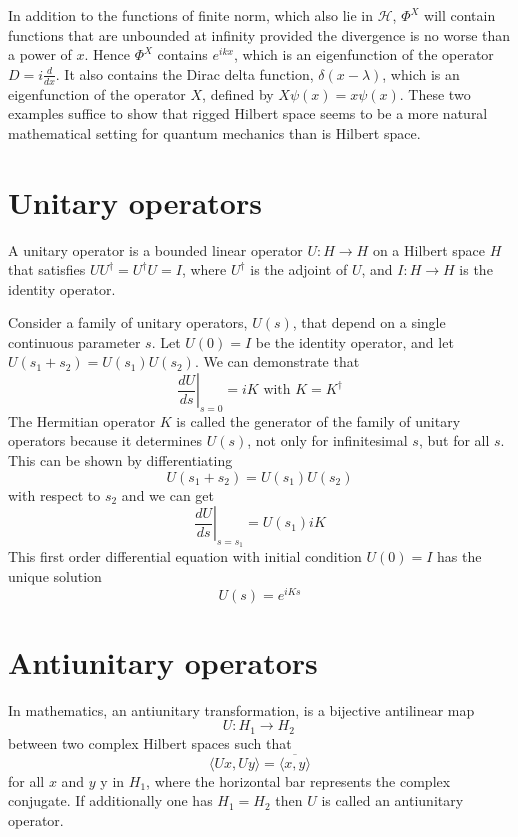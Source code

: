 In addition to the functions of finite norm, which also lie in $\mathcal{H}$, $\Phi^X$ will contain functions that are unbounded at infinity provided the divergence is no worse than a power of $x$. Hence $\Phi^X$ contains $e^{ikx}$, which is an eigenfunction
of the operator $D = i \frac{d}{dx}$. It also contains the Dirac delta function, $\delta(x-\lambda)$, which is an eigenfunction of the operator $X$, defined by $X\psi(x) = x\psi(x)$.
These two examples suffice to show that rigged Hilbert space seems to be a more natural mathematical setting for quantum mechanics than is Hilbert space.

\section{Unitary operators}
\begin{newdef}
 A unitary operator is a bounded linear operator $U: H\to H$ on a Hilbert space $H$ that satisfies $UU^{\dagger} = U^{\dagger}U =I$, where $U^{\dagger}$ is the adjoint of $U$, and $I: H \to H$ is the identity operator.
\end{newdef}
\noindent
Consider a family of unitary operators, $U(s)$, that depend on a single continuous parameter $s$. 
Let $U(0) = I $ be the identity operator, and let $U(s_1+s_2) = U(s_1)U(s_2)$.
We can demonstrate that
\[\left. \frac{dU}{ds}\right|_{s=0} = iK \mbox{ with } K = K^{\dagger}\]
The Hermitian operator $K$ is called the generator of the family of unitary operators because it determines $U(s)$, not only for infinitesimal $s$, but for all $s$. This can be shown by differentiating
\[U(s_1+s_2) = U(s_1)U(s_2)\]
with respect to $s_2$ and we can get
\[\left. \frac{dU}{ds}\right|_{s=s_1} = U(s_1)iK \]
This first order differential equation with initial condition $U(0) = I$ has the unique solution
\[U(s) = e^{iKs}\]

\section{Antiunitary operators}
\begin{newdef}
In mathematics, an antiunitary transformation, is a bijective antilinear map
\[U:H_{1}\to H_{2}\,\]
between two complex Hilbert spaces such that
\[\langle Ux,Uy\rangle ={\overline {\langle x,y\rangle }}\]
for all $x$ and $y$ y in $H_{1}$, where the horizontal bar represents the complex conjugate. If additionally one has $H_{1}=H_{2}$ then $U$ is called an antiunitary operator.
\end{newdef}

